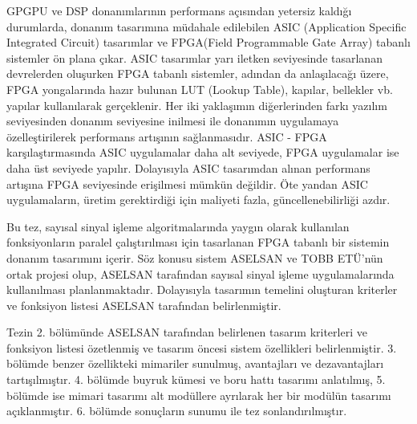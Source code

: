 GPGPU ve DSP donanımlarının performans açısından yetersiz kaldığı durumlarda, donanım tasarımına müdahale edilebilen ASIC (Application Specific Integrated Circuit) tasarımlar ve FPGA(Field Programmable Gate Array) tabanlı sistemler ön plana çıkar. ASIC tasarımlar yarı iletken seviyesinde tasarlanan devrelerden oluşurken FPGA tabanlı sistemler, adından da anlaşılacağı üzere, FPGA yongalarında hazır bulunan LUT (Lookup Table), kapılar, bellekler vb. yapılar kullanılarak gerçeklenir. Her iki yaklaşımın diğerlerinden farkı yazılım seviyesinden donanım seviyesine inilmesi ile donanımın uygulamaya özelleştirilerek performans artışının sağlanmasıdır. ASIC - FPGA karşılaştırmasında ASIC uygulamalar daha alt seviyede, FPGA uygulamalar ise daha üst seviyede yapılır. Dolayısıyla ASIC tasarımdan alınan performans artışına FPGA seviyesinde erişilmesi mümkün değildir. Öte yandan ASIC uygulamaların, üretim gerektirdiği için maliyeti fazla, güncellenebilirliği azdır. \cite{kuon2007measuring} \par

Bu tez, sayısal sinyal işleme algoritmalarında yaygın olarak kullanılan fonksiyonların paralel çalıştırılması için tasarlanan FPGA tabanlı bir sistemin donanım tasarımını içerir. Söz konusu sistem ASELSAN ve TOBB ETÜ'nün ortak projesi olup, ASELSAN tarafından sayısal sinyal işleme uygulamalarında kullanılması planlanmaktadır. Dolayısıyla tasarımın temelini oluşturan kriterler ve fonksiyon listesi ASELSAN tarafından belirlenmiştir. \par

Tezin 2. bölümünde ASELSAN tarafından belirlenen tasarım kriterleri ve fonksiyon listesi özetlenmiş ve tasarım öncesi sistem özellikleri belirlenmiştir. 3. bölümde benzer özellikteki mimariler sunulmuş, avantajları ve dezavantajları tartışılmıştır. 4. bölümde buyruk kümesi ve boru hattı tasarımı anlatılmış, 5. bölümde ise mimari tasarımı alt modüllere ayrılarak her bir modülün tasarımı açıklanmıştır. 6. bölümde sonuçların sunumu ile tez sonlandırılmıştır.  
